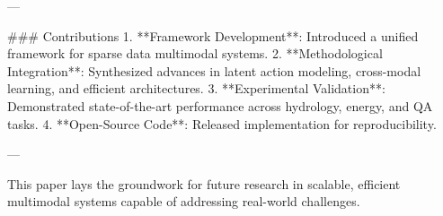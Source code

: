 ---

### Contributions
1. **Framework Development**: Introduced a unified framework for sparse data multimodal systems.
2. **Methodological Integration**: Synthesized advances in latent action modeling, cross-modal learning, and efficient architectures.
3. **Experimental Validation**: Demonstrated state-of-the-art performance across hydrology, energy, and QA tasks.
4. **Open-Source Code**: Released implementation for reproducibility.

---

This paper lays the groundwork for future research in scalable, efficient multimodal systems capable of addressing real-world challenges.